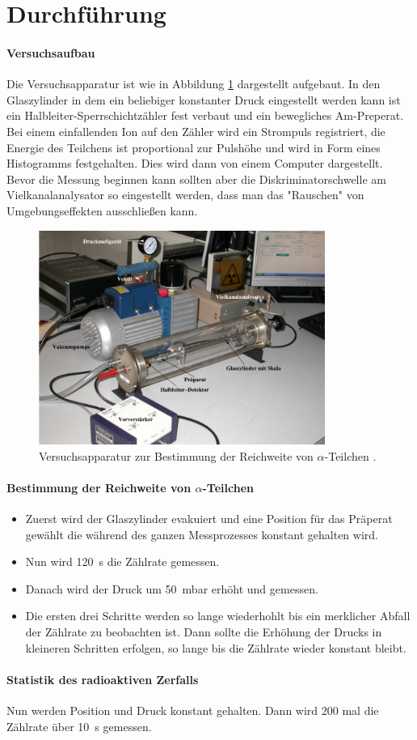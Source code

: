 \section{Durchführung}
\label{sec:Durchführung}
\paragraph{Versuchsaufbau}
Die Versuchsapparatur ist wie in Abbildung \ref{fig:VB} dargestellt aufgebaut.
In den Glaszylinder in dem ein beliebiger konstanter Druck eingestellt werden kann
ist ein Halbleiter-Sperrschichtzähler fest verbaut und ein bewegliches Am-Preperat.
Bei einem einfallenden Ion auf den Zähler wird ein Strompuls registriert,
die Energie des Teilchens ist proportional zur Pulshöhe und wird in Form eines
Histogramms festgehalten. Dies wird dann von einem Computer dargestellt. Bevor
die Messung beginnen kann sollten aber die Diskriminatorschwelle am Vielkanalanalysator
so eingestellt werden, dass man das "Rauschen" von Umgebungseffekten ausschließen kann.

\begin{figure}
  \centering
  \includegraphics[height=7cm]{logos/Versuchsaufbau.png}
  \caption{Versuchsapparatur zur Bestimmung der Reichweite von \texorpdfstring{$\alpha$}{math}-Teilchen \cite{Anleitung}.}
  \label{fig:VB}
\end{figure}
\paragraph{Bestimmung der Reichweite von \texorpdfstring{$\alpha$}{math}-Teilchen}
\begin{itemize}
  \item Zuerst wird der Glaszylinder evakuiert und eine Position für das Präperat gewählt
  die während des ganzen Messprozesses konstant gehalten wird.
  \item Nun wird \SI{120}{\second} die Zählrate gemessen.
  \item Danach wird der Druck um \SI{50}{\milli\bar} erhöht und gemessen.
  \item Die ersten drei Schritte werden so lange wiederhohlt bis ein merklicher
  Abfall der Zählrate zu beobachten ist. Dann sollte die Erhöhung der Drucks in
  kleineren Schritten erfolgen, so lange bis die Zählrate wieder konstant bleibt.
\end{itemize}
\paragraph{Statistik des radioaktiven Zerfalls}
Nun werden Position und Druck konstant gehalten. Dann wird 200 mal die
Zählrate über \SI{10}{\second} gemessen.

